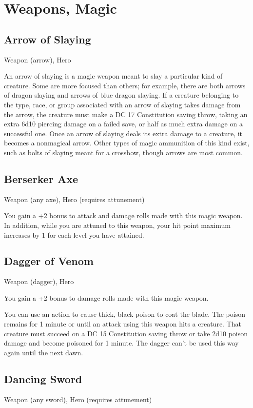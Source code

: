 \section{Weapons, Magic}\label{mi:weapons}

\subsection{Arrow of Slaying}
Weapon (arrow), Hero 

An arrow of slaying is a magic weapon meant to slay a particular kind of creature. Some are more focused than others; for example, there are both arrows of dragon slaying and arrows of blue dragon slaying. If a creature belonging to the type, race, or group associated with an arrow of slaying takes damage from the arrow, the creature must make a DC 17 Constitution saving throw, taking an extra 6d10 piercing damage on a failed save, or half as much extra damage on a successful one.  Once an arrow of slaying deals its extra damage to a creature, it becomes a nonmagical arrow. Other types of magic ammunition of this kind exist, such as bolts of slaying meant for a crossbow, though arrows are most common.

\subsection{Berserker Axe}
Weapon (any axe), Hero (requires attunement)

You gain a +2 bonus to attack and damage rolls made with this magic weapon. In addition, while you are attuned to this weapon, your hit point maximum increases by 1 for each level you have attained.

\subsection{Dagger of Venom}
Weapon (dagger), Hero

You gain a +2 bonus to damage rolls made with this magic weapon.

You can use an action to cause thick, black poison to coat the blade. The poison remains for 1 minute or until an attack using this weapon hits a creature. That creature must succeed on a DC 15 Constitution saving throw or take 2d10 poison damage and become poisoned for 1 minute. The dagger can't be used this way again until the next dawn.

\subsection{Dancing Sword}
Weapon (any sword), Hero (requires attunement)

